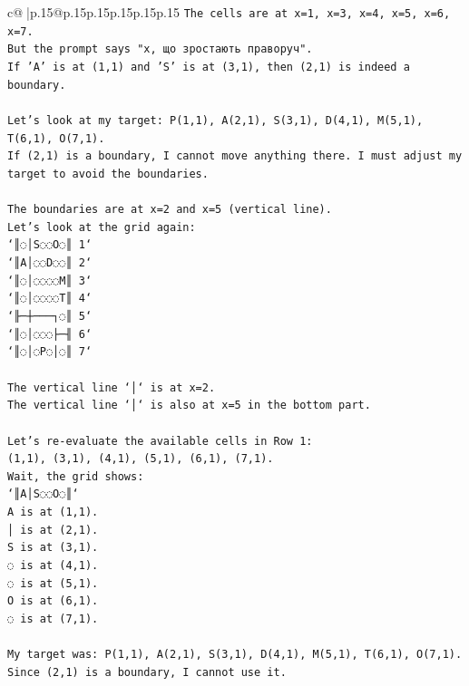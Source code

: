 \documentclass{article}
\begin{document}
{\begin{supertabular}{c@{$\;$}|p{.15\linewidth}@{}p{.15\linewidth}p{.15\linewidth}p{.15\linewidth}p{.15\linewidth}p{.15\linewidth}}
{{{\texttt{The cells are at x=1, x=3, x=4, x=5, x=6, x=7.} \\
\texttt{But the prompt says "x, що зростають праворуч".} \\
\texttt{If 'A' is at (1,1) and 'S' is at (3,1), then (2,1) is indeed a boundary.} \\
\\ 
\texttt{Let's look at my target: P(1,1), A(2,1), S(3,1), D(4,1), M(5,1), T(6,1), O(7,1).} \\
\texttt{If (2,1) is a boundary, I cannot move anything there. I must adjust my target to avoid the boundaries.} \\
\\ 
\texttt{The boundaries are at x=2 and x=5 (vertical line).} \\
\texttt{Let's look at the grid again:} \\
\texttt{`║◌│S◌◌O◌║ 1`} \\
\texttt{`║A│◌◌D◌◌║ 2`} \\
\texttt{`║◌│◌◌◌◌M║ 3`} \\
\texttt{`║◌│◌◌◌◌T║ 4`} \\
\texttt{`╟─┼───┐◌║ 5`} \\
\texttt{`║◌│◌◌◌├─╢ 6`} \\
\texttt{`║◌│◌P◌│◌║ 7`} \\
\\ 
\texttt{The vertical line `│` is at x=2.} \\
\texttt{The vertical line `│` is also at x=5 in the bottom part.} \\
\\ 
\texttt{Let's re{-}evaluate the available cells in Row 1:} \\
\texttt{(1,1), (3,1), (4,1), (5,1), (6,1), (7,1).} \\
\texttt{Wait, the grid shows:} \\
\texttt{`║A│S◌◌O◌║`} \\
\texttt{A is at (1,1).} \\
\texttt{│ is at (2,1).} \\
\texttt{S is at (3,1).} \\
\texttt{◌ is at (4,1).} \\
\texttt{◌ is at (5,1).} \\
\texttt{O is at (6,1).} \\
\texttt{◌ is at (7,1).} \\
\\ 
\texttt{My target was: P(1,1), A(2,1), S(3,1), D(4,1), M(5,1), T(6,1), O(7,1).} \\
\texttt{Since (2,1) is a boundary, I cannot use it.} \\
}}}
\end{supertabular}}
\end{document}
